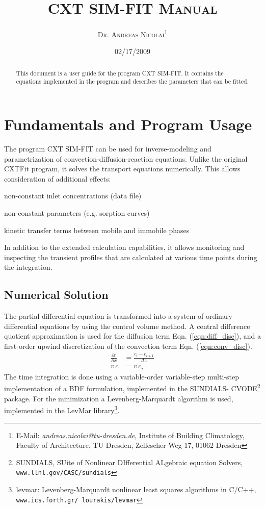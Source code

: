 \documentclass[a4paper,fleqn,11pt]{article}
\numberwithin{equation}{section}
\newcommand{\eqn}[1]{(\ref{#1})}
\newenvironment{tight_itemize}
{\begin{itemize}
  \setlength{\itemsep}{1pt}
  \setlength{\parskip}{0pt}
  \setlength{\parsep}{0pt}}
{\end{itemize}}
\begin{document}
\title{\textsc{CXT SIM-FIT Manual}}%
\author{\textsc{Dr. Andreas Nicolai}\footnote{E-Mail: \emph{andreas.nicolai@tu-dresden.de}, Institute of Building Climatology, Faculty of Architecture, TU Dresden, Zellescher Weg 17, 01062 Dresden}}

\date{\small 02/17/2009}%
\maketitle
\begin{abstract}
\noindent This document is a user guide for the program CXT SIM-FIT. It contains the equations implemented in the program and describes the parameters that can be fitted.
\end{abstract}
\section{Fundamentals and Program Usage}
The program CXT SIM-FIT can be used for inverse-modeling and parametrization of convection-diffusion-reaction equations. Unlike the original CXTFit program, it solves the transport equations numerically. This allows consideration of additional effects:
\begin{tight_itemize}
  \item non-constant inlet concentrations (data file)
  \item non-constant parameters (e.g. sorption curves)
  \item kinetic transfer terms between mobile and immobile phases
\end{tight_itemize}
In addition to the extended calculation capabilities, it allows monitoring and inspecting the transient profiles that are calculated at various time points during the integration.

\subsection{Numerical Solution}
The partial differential equation is transformed into a system of ordinary differential equations by using the control volume method. A central difference quotient approximation is used for the diffusion term Eqn. \eqn{eqn:diff_disc}, and a first-order upwind discretization of the convection term Eqn. \eqn{eqn:conv_disc}.
\begin{align}
\frac{\partial c}{\partial x} &= \frac{c_{i} - c_{i+1}}{\Delta x}  \label{eqn:diff_disc} \\
v\,c &= v\, c_i\label{eqn:conv_disc}
\end{align}
The time integration is done using a variable-order variable-step multi-step implementation of a BDF formulation, implemented in the \mbox{SUNDIALS}- \mbox{CVODE}\footnote{SUNDIALS, SUite of Nonlinear DIfferential ALgebraic equation Solvers, \texttt{www.llnl.gov/CASC/sundials}} package. For the minimization a Levenberg-Marquardt algorithm is used, implemented in the LevMar library\footnote{levmar: Levenberg-Marquardt nonlinear least squares algorithms in C/C++, \texttt{www.ics.forth.gr/~lourakis/levmar}}.
\end{document}
